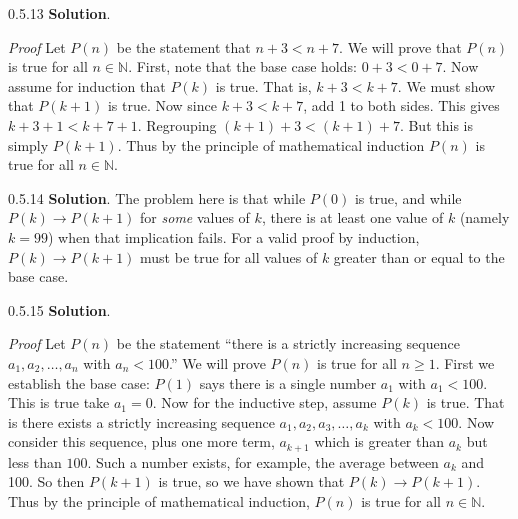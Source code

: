 \documentclass[11pt,]{book}
\makeatletter
\theoremstyle{ptxplainnotitle}
\theoremstyle{ptxplaintitle}
\renewcommand*{\proofname}{Proof}
\renewenvironment{proof}[1][\proofname]{\par
  \pushQED{\qed}%
  \normalfont \topsep6\p@\@plus6\p@\relax
  \trivlist
  \item\relax
    {\itshape
    #1\@addpunct{.}}\hspace\labelsep\ignorespaces
}{%
  \popQED\endtrivlist\@endpefalse
}
\theoremstyle{ptxdefinitionnotitle}
\theoremstyle{ptxdefinitiontitle}
\theoremstyle{ptxdefinitionnotitle}
\theoremstyle{ptxdefinitiontitle}
\theoremstyle{ptxdefinitionnotitle}
\theoremstyle{ptxdefinitiontitle}
\theoremstyle{ptxdefinitiontitlenonumber}
\theoremstyle{ptxdefinitiontitlenonumber}
\numberwithin{equation}{chapter}
\newcommand{\N}{\mathbb N}
\newcommand{\imp}{\rightarrow}
\newcommand{\lt}{<}
\makeatother
\begin{document}
\begin{divisionexercise}{0.5.13}
\textbf{Solution}.\quad%
\begin{proof}\hypertarget{proof-15}{}
\hypertarget{p-661}{}%
Let \(P(n)\) be the statement that \(n + 3 \lt  n + 7\). We will prove that \(P(n)\) is true for all \(n \in \N\). First, note that the base case holds: \(0+3 \lt  0+7\). Now assume for induction that \(P(k)\) is true. That is, \(k+3 \lt  k+7\). We must show that \(P(k+1)\) is true. Now since \(k + 3 \lt  k + 7\), add 1 to both sides. This gives \(k + 3 + 1 \lt  k + 7 + 1\). Regrouping \((k+1) + 3 \lt  (k+1) + 7\). But this is simply \(P(k+1)\). Thus by the principle of mathematical induction \(P(n)\) is true for all \(n \in \N\).%
\end{proof}
\end{divisionexercise}%
\begin{divisionexercise}{0.5.14}
\textbf{Solution}.\quad%
\hypertarget{p-664}{}%
The problem here is that while \(P(0)\) is true, and while \(P(k) \imp P(k+1)\) for \emph{some} values of \(k\), there is at least one value of \(k\) (namely \(k = 99\)) when that implication fails. For a valid proof by induction, \(P(k) \imp P(k+1)\) must be true for all values of \(k\) greater than or equal to the base case.%
\end{divisionexercise}%
\begin{divisionexercise}{0.5.15}
\textbf{Solution}.\quad%
\begin{proof}\hypertarget{proof-17}{}
\hypertarget{p-666}{}%
Let \(P(n)\) be the statement ``there is a strictly increasing sequence \(a_1, a_2, \ldots, a_n\) with \(a_n \lt  100\).'' We will prove \(P(n)\) is true for all \(n \ge 1\). First we establish the base case: \(P(1)\) says there is a single number \(a_1\) with \(a_1 \lt  100\). This is true \textendash{} take \(a_1 = 0\). Now for the inductive step, assume \(P(k)\) is true. That is there exists a strictly increasing sequence \(a_1, a_2, a_3, \ldots, a_k\) with \(a_k \lt  100\). Now consider this sequence, plus one more term, \(a_{k+1}\) which is greater than \(a_k\) but less than \(100\). Such a number exists, for example, the average between \(a_k\) and 100. So then \(P(k+1)\) is true, so we have shown that \(P(k) \imp P(k+1)\). Thus by the principle of mathematical induction, \(P(n)\) is true for all \(n \in \N\).%
\end{proof}
\end{divisionexercise}%
\end{document}
